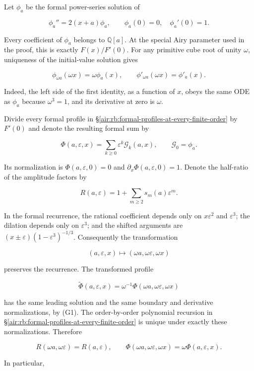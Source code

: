 \documentclass[11pt,letterpaper]{article}
\numberwithin{equation}{section}
\theoremstyle{remark}
\begin{document}
Let \(\phi_a\) be the formal power-series solution of

\[
\phi_a''=2(x+a)\phi_a,\qquad \phi_a(0)=0,\quad\phi_a'(0)=1.
\]

Every coefficient of \(\phi_a\) belongs to \(\mathbb Q[a]\). At the special Airy parameter used in the proof, this is exactly \(F(x)/F'(0)\). For any primitive cube root of unity \(\omega\), uniqueness of the initial-value solution gives

\[
\phi_{\omega a}(\omega x)=\omega\phi_a(x),\qquad
\phi'_{\omega a}(\omega x)=\phi'_a(x).
\tag{G1}
\]

Indeed, the left side of the first identity, as a function of \(x\), obeys the same ODE as \(\phi_a\) because \(\omega^3=1\), and its derivative at zero is \(\omega\).

Divide every formal profile in \S\ref{air:rb:formal-profiles-at-every-finite-order} by \(F'(0)\) and denote the resulting formal sum by

\[
\Phi(a,\varepsilon,x)=\sum_{k\ge0}\varepsilon^k\mathcal G_k(a,x),
\qquad \mathcal G_0=\phi_a.
\]

Its normalization is \(\Phi(a,\varepsilon,0)=0\) and \(\partial_x \Phi(a,\varepsilon,0)=1\). Denote the half-ratio of the amplitude factors by

\[
R(a,\varepsilon)=1+\sum_{m\ge2}s_m(a)\varepsilon^m.
\]

In the formal recurrence, the rational coefficient depends only on \(x \varepsilon^2\) and \(\varepsilon^3\); the dilation depends only on \(\varepsilon^3\); and the shifted arguments are \((x\pm \varepsilon)(1-\varepsilon^3)^{-1/3}\). Consequently the transformation

\[
(a,\varepsilon,x)\longmapsto(\omega a,\omega\varepsilon,\omega x)
\]

preserves the recurrence. The transformed profile

\[
\widetilde\Phi(a,\varepsilon,x)
=\omega^{-1}\Phi(\omega a,\omega\varepsilon,\omega x)
\]

has the same leading solution and the same boundary and derivative normalizations, by (G1). The order-by-order polynomial recursion in \S\ref{air:rb:formal-profiles-at-every-finite-order} is unique under exactly these normalizations. Therefore

\[
R(\omega a,\omega\varepsilon)=R(a,\varepsilon),\qquad
\Phi(\omega a,\omega\varepsilon,\omega x)
=\omega\Phi(a,\varepsilon,x).
\tag{G2}
\]

In particular,
\end{document}
